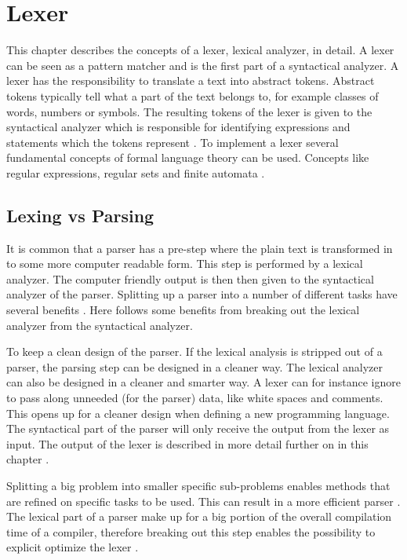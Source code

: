 \chapter{Lexer \label{chap:lexer}}
This chapter describes the concepts of a lexer, lexical analyzer, in detail. A
lexer can be seen as a pattern matcher and is the first part of a syntactical
analyzer. A lexer has the responsibility to translate a text into abstract
tokens. Abstract tokens typically tell what a part of the text belongs to, for
example classes of words, numbers or symbols. The resulting tokens of the lexer
is given to the syntactical analyzer which is responsible for identifying
expressions and statements which the tokens represent \cite{sebesta2012}.
To implement a lexer several fundamental concepts of
formal language theory can be used. Concepts like regular expressions, regular
sets and finite automata \cite{Aho1990}.

\section{Lexing vs Parsing}
It is common that a parser has a pre-step where the plain text is transformed
in to some more computer readable form. This step is performed by a lexical
analyzer.
The computer friendly output is then then given to the syntactical analyzer of
the parser. Splitting up a parser into a number of different tasks have several
benefits \cite{sebesta2012}. Here follows some benefits from breaking out the
lexical analyzer from the syntactical analyzer.

To keep a clean design of the parser. If the lexical analysis is stripped out of
a parser, the parsing step can be designed in a cleaner way. The lexical
analyzer can also be designed in a cleaner and smarter way. A lexer can for
instance ignore to pass along unneeded (for the parser) data, like white spaces
and comments. This opens up for a cleaner design when defining a new programming
language. The syntactical part of the parser will only receive the output from
the lexer as input. The output of the lexer is described in more detail further
on in this chapter \cite{Aho2006}.

\newpage

Splitting a big problem into smaller specific sub-problems enables methods that
are refined on specific tasks to be used. This can result in a more efficient
parser \cite{Aho2006}. The lexical part of a parser make up for a big portion
of the overall compilation time of a compiler, therefore breaking out this step
enables the possibility to explicit optimize the lexer \cite{sebesta2012}.

